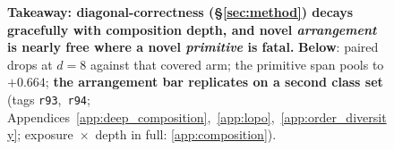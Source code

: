 \begin{figure}[t]
{\begin{tikzpicture}[font=\footnotesize]
\end{tikzpicture}}
\caption{\textbf{Takeaway: diagonal-correctness (\S\ref{sec:method}) decays gracefully with composition depth, and novel
\emph{arrangement} is nearly free where a novel \emph{primitive} is fatal.} \textbf{Below}: paired drops at
$d{=}8$ against that covered arm; the primitive span pools to $+0.664$; \textbf{the arrangement bar
replicates on a second class set} (tags \texttt{r93},~\texttt{r94}; Appendices~\ref{app:deep_composition},~\ref{app:lopo},~\ref{app:order_diversity}; exposure~$\times$~depth in full: \ref{app:composition}).}
\label{fig:novelty_cost}
\end{figure}
